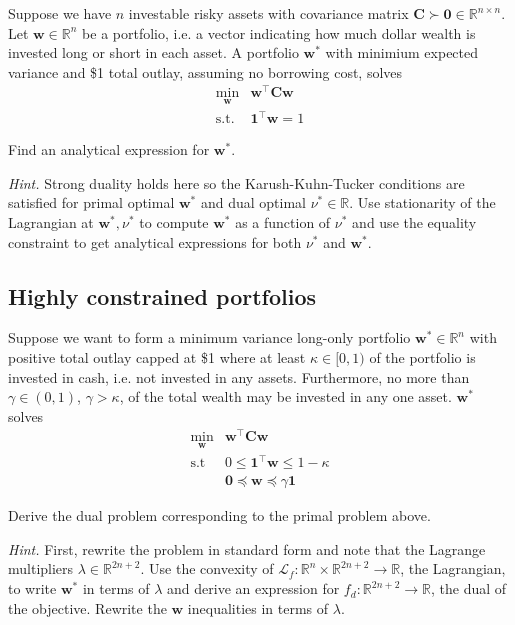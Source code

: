 \documentclass{article}
\numberwithin{equation}{section}
\begin{document}
Suppose we have $ n $ investable risky assets with covariance matrix
$ \mathbf{C} \succ \mathbf{0} \in \mathbb{R}^{n \times n} $. Let
$ \mathbf{w} \in \mathbb{R}^n $ be a portfolio, i.e. a vector indicating how
much dollar wealth is invested long or short in each asset. A portfolio
$ \mathbf{w}^* $ with minimium expected variance and \$1 total outlay,
assuming no borrowing cost, solves
\begin{equation*}
    \begin{array}{ll}
        \displaystyle\min_{\mathbf{w}} & \mathbf{w}^\top\mathbf{Cw} \\
        \text{s.t.} & \mathbf{1}^\top\mathbf{w} = 1
    \end{array}
\end{equation*}

Find an analytical expression for $ \mathbf{w}^* $.

\medskip

\textit{Hint.} Strong duality holds here so the Karush-Kuhn-Tucker conditions
are satisfied for primal optimal $ \mathbf{w}^* $ and dual optimal
$ \nu^* \in \mathbb{R} $. Use stationarity of the Lagrangian at
$ \mathbf{w}^*, \nu^* $ to compute $ \mathbf{w}^* $ as a function of
$ \nu^* $ and use the equality constraint to get analytical expressions for
both $ \nu^* $ and $ \mathbf{w}^* $.

\subsection{Highly constrained portfolios}

Suppose we want to form a minimum variance long-only portfolio
$ \mathbf{w}^* \in \mathbb{R}^n $ with positive total outlay capped at \$1
where at least $ \kappa \in [0, 1) $ of the portfolio is invested in cash,
i.e. not invested in any assets. Furthermore, no more than
$ \gamma \in (0, 1) $, $ \gamma > \kappa $, of the total wealth may be
invested in any one asset. $ \mathbf{w}^* $ solves
\begin{equation*}
    \begin{array}{ll}
        \displaystyle\min_\mathbf{w} & \mathbf{w}^\top\mathbf{Cw} \\
        \text{s.t} & 0 \le \mathbf{1}^\top\mathbf{w} \le 1 - \kappa \\
        & \mathbf{0} \preceq \mathbf{w} \preceq \gamma\mathbf{1}
    \end{array}
\end{equation*}

Derive the dual problem corresponding to the primal problem above.

\medskip

\textit{Hint.} First, rewrite the problem in standard form and note that
the Lagrange multipliers $ \lambda \in \mathbb{R}^{2n + 2} $. Use the
convexity of $ \mathcal{L}_f : \mathbb{R}^n \times \mathbb{R}^{2n + 2}
\rightarrow \mathbb{R} $, the Lagrangian, to write $ \mathbf{w}^* $ in terms
of $ \lambda $ and derive an expression for $ f_d : \mathbb{R}^{2n + 2}
\rightarrow \mathbb{R} $, the dual of the objective. Rewrite the
$ \mathbf{w} $ inequalities in terms of $ \lambda $.
\end{document}
